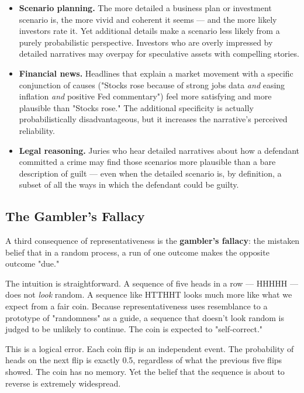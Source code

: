 \documentclass[12pt, letterpaper]{article}
\begin{document}
\begin{itemize}
\item \textbf{Scenario planning.} The more detailed a business plan or investment scenario is, the more vivid and coherent it seems --- and the more likely investors rate it. Yet additional details make a scenario less likely from a purely probabilistic perspective. Investors who are overly impressed by detailed narratives may overpay for speculative assets with compelling stories.
\item \textbf{Financial news.} Headlines that explain a market movement with a specific conjunction of causes ("Stocks rose because of strong jobs data \textit{and} easing inflation \textit{and} positive Fed commentary") feel more satisfying and more plausible than "Stocks rose." The additional specificity is actually probabilistically disadvantageous, but it increases the narrative's perceived reliability.
\item \textbf{Legal reasoning.} Juries who hear detailed narratives about how a defendant committed a crime may find those scenarios more plausible than a bare description of guilt --- even when the detailed scenario is, by definition, a subset of all the ways in which the defendant could be guilty.
\end{itemize}

\medskip


\subsection{The Gambler's Fallacy}


A third consequence of representativeness is the \textbf{gambler's fallacy}: the mistaken belief that in a random process, a run of one outcome makes the opposite outcome "due."

The intuition is straightforward. A sequence of five heads in a row --- HHHHH --- does not \textit{look} random. A sequence like HTTHHT looks much more like what we expect from a fair coin. Because representativeness uses resemblance to a prototype of "randomness" as a guide, a sequence that doesn't look random is judged to be unlikely to continue. The coin is expected to "self-correct."

This is a logical error. Each coin flip is an independent event. The probability of heads on the next flip is exactly 0.5, regardless of what the previous five flips showed. The coin has no memory. Yet the belief that the sequence is about to reverse is extremely widespread.
\end{document}
